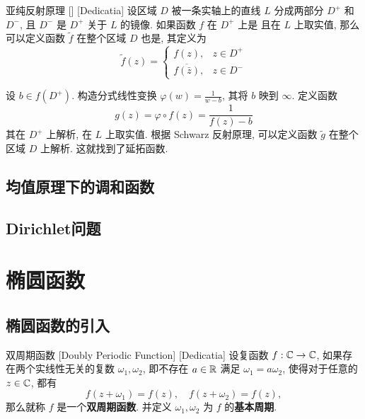         \begin{thm}
            {亚纯反射原理}
            []
            [Dedicatia]
            设区域 \(D\) 被一条实轴上的直线 \(L\) 分成两部分 \(D^+\) 和 \(D^-\), 且 \(D^-\) 是 \(D^+\) 关于 \(L\) 的镜像. 如果函数 \(f\) 在 \(D^+\) 上是\Meromorphic{} 且在 \(L\) 上取实值, 那么可以定义函数 \(\tilde{f}\) 在整个区域 \(D\) 也是\Meromorphic{}, 其定义为
            \[\tilde{f}(z)=\begin{cases}
                f(z), & z\in D^+\\
                \overline{f(\bar{z})}, & z\in D^-
            \end{cases}\]
        \end{thm}

        \begin{prf}
            设 \(b\in f(D^+)\). 构造分式线性变换 \(\varphi(w)=\frac{1}{w-b}\), 其将 \(b\) 映到 \(\infty\). 定义函数
            \[g(z)=\varphi\circ f(z)=\frac{1}{f(z)-b}\]
            其在 \(D^+\) 上解析, 在 \(L\) 上取实值. 根据 Schwarz 反射原理, 可以定义函数 \(\tilde{g}\) 在整个区域 \(D\) 上解析. 这就找到了延拓函数.
        \end{prf}
    
    \subsection{均值原理下的调和函数}
    
    \subsection{Dirichlet问题}

\section{椭圆函数}

    \subsection{椭圆函数的引入}

        \begin{dfn}
            {双周期函数}
            [Doubly Periodic Function]
            [Dedicatia]
            设复函数 \(f:\operatorname{\mathbb{C}}\to\operatorname{\mathbb{C}}\), 如果存在两个实线性无关的复数 \(\omega_1,\omega_2\), 即不存在 \(a\in\operatorname{\mathbb{R}}\) 满足 \(\omega_1=a\omega_2\), 使得对于任意的 \(z\in\operatorname{\mathbb{C}}\), 都有
            \[f(z+\omega_1)=f(z),\quad f(z+\omega_2)=f(z),\]
            那么就称 \(f\) 是一个\textbf{双周期函数}. 并定义 \(\omega_1,\omega_2\) 为 \(f\) 的\textbf{基本周期}.
        \end{dfn}

